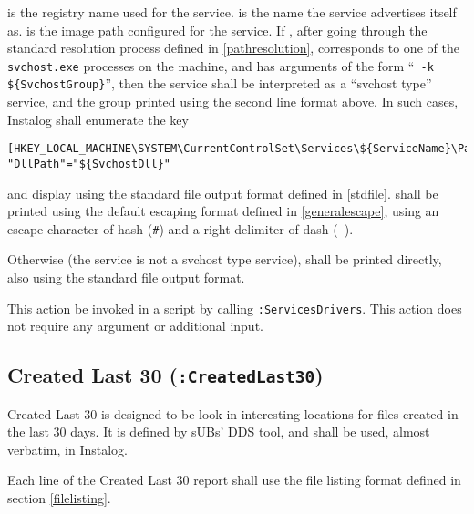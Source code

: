  is the registry name used for the service. 
is the name the service advertises itself as.  is the image path
configured for the service. If , after going through the standard
resolution process defined in \ref{pathresolution}, corresponds to one of the
\verb|svchost.exe| processes on the machine, and has arguments of the form
``\verb| -k ${SvchostGroup}|'', then the service shall be interpreted as a
``svchost type'' service, and the group printed using the second line format
above. In such cases, Instalog shall enumerate the key
\begin{verbatim}
[HKEY_LOCAL_MACHINE\SYSTEM\CurrentControlSet\Services\${ServiceName}\Parameters]
"DllPath"="${SvchostDll}"
\end{verbatim}
and display  using the standard file output format defined in
\ref{stdfile}.  shall be printed using the default escaping
format defined in \ref{generalescape}, using an escape character of hash
(\verb|#|) and a right delimiter of dash (\verb|-|).

Otherwise (the service is not a svchost type service),  shall be
printed directly, also using the standard file output format.

This action be invoked in a script by calling \verb|:ServicesDrivers|.  This
action does not require any argument or additional input.

\subsection{Created Last 30 (\texttt{:CreatedLast30})}
Created Last 30 is designed to be look in interesting locations for files
created in the last 30 days. It is defined by sUBs' DDS tool, and shall be used,
almost verbatim, in Instalog.

Each line of the Created Last 30 report shall use the file listing format
defined in section \ref{filelisting}.

